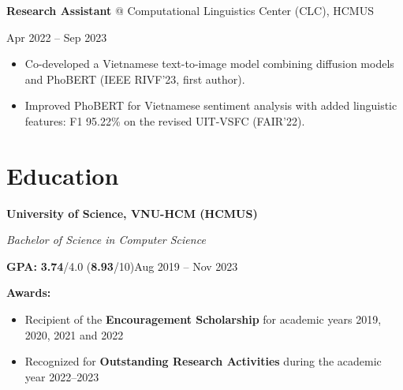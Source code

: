 \documentclass[10pt, a4paper]{article}
\newenvironment{highlights}{
    \begin{itemize}[
        topsep=1.5 pt,
        parsep=0pt,
        partopsep=0pt,
        itemsep=1.5 pt,
        leftmargin=12 pt
    ]
}{
    \end{itemize}
} %
\newenvironment{twocolentry}[2][]{
    \def\secondColumn{#2}
    \par
}{
    \unskip\hfill\secondColumn\par
} %
\begin{document}
        \begin{twocolentry}{Apr 2022 -- Sep 2023}
            \textbf{Research Assistant} @ Computational Linguistics Center (CLC), HCMUS
        \end{twocolentry}
        \begin{highlights}
            \item Co-developed a Vietnamese text-to-image model combining diffusion models and PhoBERT (IEEE RIVF'23, first author).
            \item Improved PhoBERT for Vietnamese sentiment analysis with added linguistic features: F1 95.22\% on the revised UIT-VSFC (FAIR'22).
        \end{highlights}

    \section{Education}
        \begin{minipage}[t]{0.43\linewidth}
            \textbf{University of Science, VNU-HCM (HCMUS)}\par
            \textit{Bachelor of Science in Computer Science}\par
            \textbf{GPA:} \textbf{3.74}/4.0 (\textbf{8.93}/10)\hfill Aug 2019 -- Nov 2023\par
            \textbf{Awards:}
            \begin{highlights}
                \item Recipient of the \textbf{Encouragement Scholarship} for academic years 2019, 2020, 2021 and 2022
                \item Recognized for \textbf{Outstanding Research Activities} during the academic year 2022--2023
            \end{highlights}
        \end{minipage}\hfill
\end{document}
